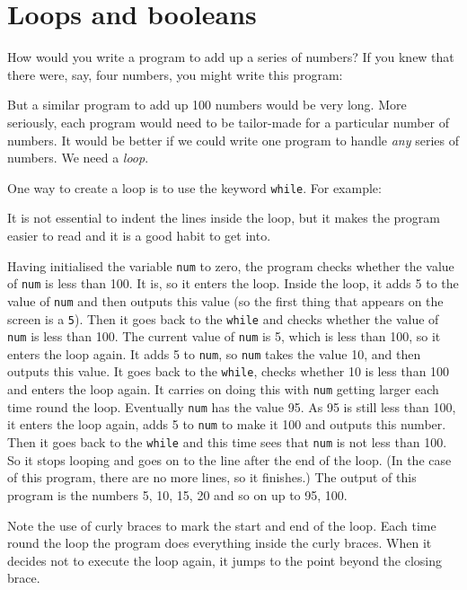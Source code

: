 \section{Loops and booleans}

How would you write a program to add up a series of numbers?
If you knew that there were, say, four numbers, you might write
this program:


But a similar program to add up 100 numbers would be very long.
More seriously, each program would need to be tailor-made for a particular
number of numbers.  It would be better if we could write one program
to handle \emph{any} series of numbers.  We need a \emph{loop}.

One way to create a loop is to use the keyword \texttt{while}.
For example:


It is not essential to indent the lines inside the loop, but it makes the
program easier to read and it is a good habit to get into.


Having initialised the variable \texttt{num} to zero, the program checks
whether the value of \texttt{num} is less than 100.  It is, so it
enters the loop.  Inside the loop, it adds 5 to the value of
\texttt{num} and then outputs this value (so the first thing that
appears on the screen is a \texttt{5}).  Then it goes back to the
  \texttt{while} and checks whether the value of \texttt{num} is less than
100.  The current value of \texttt{num} is 5, which is less than 100,
so it enters the loop again.  It adds 5 to \texttt{num}, so
\texttt{num} takes the value 10, and then outputs this value.  It goes back
to the \texttt{while}, checks whether 10 is less than 100 and enters
the loop again.  It carries on doing this with \texttt{num} getting
larger each time round the loop.  Eventually \texttt{num} has the
value 95. As 95 is still less than 100, it enters the loop again, adds 5 to
\texttt{num} to make it 100 and outputs this number.  Then it goes
back to the \texttt{while} and this time sees that \texttt{num} is not
less than 100.  So it stops looping and goes on to the line after the
end of the loop.  (In the case of this program, there are no more
lines, so it finishes.)  The output of this program is the numbers 5,
10, 15, 20 and so on up to 95, 100.

Note the use of curly braces to mark the start and end of the loop.
Each time round the loop the program does everything inside the curly braces.
When it decides not to execute the loop again, it jumps to the point
beyond the closing brace.

